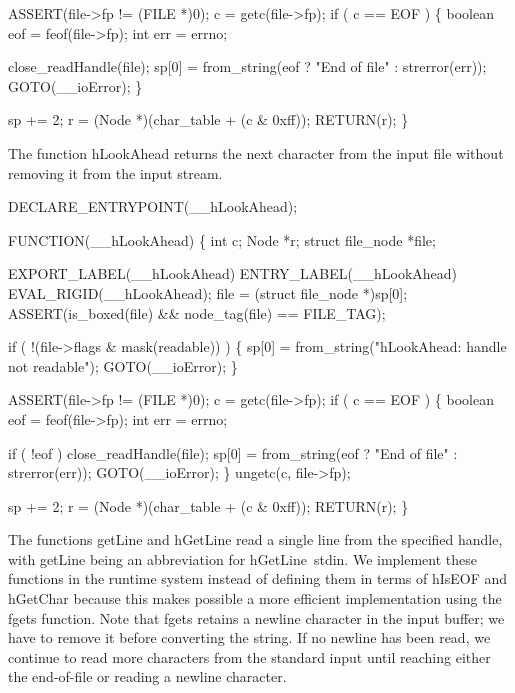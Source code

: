     ASSERT(file->fp != (FILE *)0);
    c = getc(file->fp);
    if ( c == EOF )
    \{
        boolean eof = feof(file->fp);
        int     err = errno;

        close_readHandle(file);
        sp[0] = from_string(eof ? "End of file" : strerror(err));
        GOTO(__ioError);
    \}

    sp += 2;
    r   = (Node *)(char_table + (c & 0xff));
    RETURN(r);
\}

\nwendcode{}\nwdocspar
The function {\Tt{}hLookAhead\nwendquote} returns the next character from the input
file without removing it from the input stream.

\nwenddocs{}\plusendmoddef\nwstartdeflinemarkup{}\nwenddeflinemarkup
DECLARE_ENTRYPOINT(__hLookAhead);

FUNCTION(__hLookAhead)
\{
    int              c;
    Node             *r;
    struct file_node *file;

    EXPORT_LABEL(__hLookAhead)
 ENTRY_LABEL(__hLookAhead)
    EVAL_RIGID(__hLookAhead);
    file = (struct file_node *)sp[0];
    ASSERT(is_boxed(file) && node_tag(file) == FILE_TAG);

    if ( !(file->flags & mask(readable)) )
    \{
        sp[0] = from_string("hLookAhead: handle not readable");
        GOTO(__ioError);
    \}

    ASSERT(file->fp != (FILE *)0);
    c = getc(file->fp);
    if ( c == EOF )
    \{
        boolean eof = feof(file->fp);
        int     err = errno;

        if ( !eof )
            close_readHandle(file);
        sp[0] = from_string(eof ? "End of file" : strerror(err));
        GOTO(__ioError);
    \}
    ungetc(c, file->fp);

    sp += 2;
    r   = (Node *)(char_table + (c & 0xff));
    RETURN(r);
\}

\nwendcode{}\nwdocspar
The functions {\Tt{}getLine\nwendquote} and {\Tt{}hGetLine\nwendquote} read a single line from the
specified handle, with {\Tt{}getLine\nwendquote} being an abbreviation for
{\Tt{}hGetLine\ stdin\nwendquote}. We implement these functions in the runtime system
instead of defining them in terms of {\Tt{}hIsEOF\nwendquote} and {\Tt{}hGetChar\nwendquote}
because this makes possible a more efficient implementation using
the {\Tt{}fgets\nwendquote} function. Note that {\Tt{}fgets\nwendquote} retains a newline
character in the input buffer; we have to remove it before converting
the string. If no newline has been read, we continue to read more
characters from the standard input until reaching either the
end-of-file or reading a newline character.

